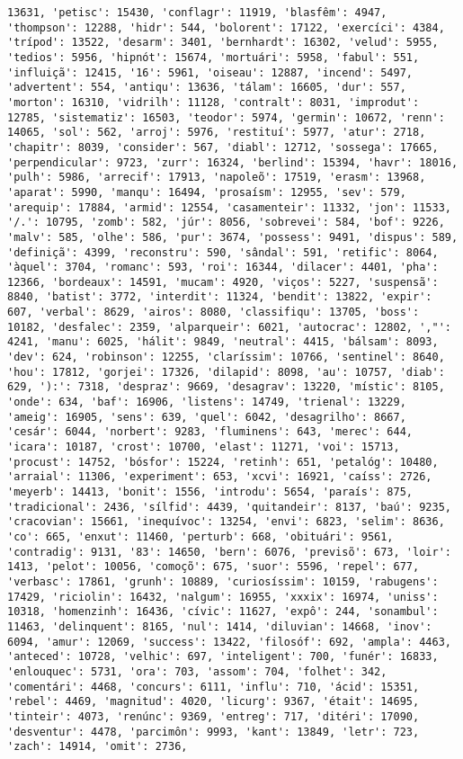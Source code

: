 \documentclass[11pt]{article}
\begin{document}
\begin{Verbatim}[commandchars=\\\{\}]
13631, 'petisc': 15430, 'conflagr': 11919, 'blasfêm': 4947, 'thompson': 12288, 'hidr': 544, 'bolorent': 17122, 'exercíci': 4384, 'trípod': 13522, 'desarm': 3401, 'bernhardt': 16302, 'velud': 5955, 'tedios': 5956, 'hipnót': 15674, 'mortuári': 5958, 'fabul': 551, 'influiçã': 12415, '16': 5961, 'oiseau': 12887, 'incend': 5497, 'advertent': 554, 'antiqu': 13636, 'tálam': 16605, 'dur': 557, 'morton': 16310, 'vidrilh': 11128, 'contralt': 8031, 'improdut': 12785, 'sistematiz': 16503, 'teodor': 5974, 'germin': 10672, 'renn': 14065, 'sol': 562, 'arroj': 5976, 'restituí': 5977, 'atur': 2718, 'chapitr': 8039, 'consider': 567, 'diabl': 12712, 'sossega': 17665, 'perpendicular': 9723, 'zurr': 16324, 'berlind': 15394, 'havr': 18016, 'pulh': 5986, 'arrecif': 17913, 'napoleõ': 17519, 'erasm': 13968, 'aparat': 5990, 'manqu': 16494, 'prosaísm': 12955, 'sev': 579, 'arequip': 17884, 'armid': 12554, 'casamenteir': 11332, 'jon': 11533, '/.': 10795, 'zomb': 582, 'júr': 8056, 'sobrevei': 584, 'bof': 9226, 'malv': 585, 'olhe': 586, 'pur': 3674, 'possess': 9491, 'dispus': 589, 'definiçã': 4399, 'reconstru': 590, 'sândal': 591, 'retific': 8064, 'àquel': 3704, 'romanc': 593, 'roi': 16344, 'dilacer': 4401, 'pha': 12366, 'bordeaux': 14591, 'mucam': 4920, 'viços': 5227, 'suspensã': 8840, 'batist': 3772, 'interdit': 11324, 'bendit': 13822, 'expir': 607, 'verbal': 8629, 'airos': 8080, 'classifiqu': 13705, 'boss': 10182, 'desfalec': 2359, 'alparqueir': 6021, 'autocrac': 12802, ',"': 4241, 'manu': 6025, 'hálit': 9849, 'neutral': 4415, 'bálsam': 8093, 'dev': 624, 'robinson': 12255, 'claríssim': 10766, 'sentinel': 8640, 'hou': 17812, 'gorjei': 17326, 'dilapid': 8098, 'au': 10757, 'diab': 629, '):': 7318, 'despraz': 9669, 'desagrav': 13220, 'místic': 8105, 'onde': 634, 'baf': 16906, 'listens': 14749, 'trienal': 13229, 'ameig': 16905, 'sens': 639, 'quel': 6042, 'desagrilho': 8667, 'cesár': 6044, 'norbert': 9283, 'fluminens': 643, 'merec': 644, 'icara': 10187, 'crost': 10700, 'elast': 11271, 'voi': 15713, 'procust': 14752, 'bósfor': 15224, 'retinh': 651, 'petalóg': 10480, 'arraial': 11306, 'experiment': 653, 'xcvi': 16921, 'caíss': 2726, 'meyerb': 14413, 'bonit': 1556, 'introdu': 5654, 'paraís': 875, 'tradicional': 2436, 'sílfid': 4439, 'quitandeir': 8137, 'baú': 9235, 'cracovian': 15661, 'inequívoc': 13254, 'envi': 6823, 'selim': 8636, 'co': 665, 'enxut': 11460, 'perturb': 668, 'obituári': 9561, 'contradig': 9131, '83': 14650, 'bern': 6076, 'previsõ': 673, 'loir': 1413, 'pelot': 10056, 'comoçõ': 675, 'suor': 5596, 'repel': 677, 'verbasc': 17861, 'grunh': 10889, 'curiosíssim': 10159, 'rabugens': 17429, 'riciolin': 16432, 'nalgum': 16955, 'xxxix': 16974, 'uniss': 10318, 'homenzinh': 16436, 'cívic': 11627, 'expô': 244, 'sonambul': 11463, 'delinquent': 8165, 'nul': 1414, 'diluvian': 14668, 'inov': 6094, 'amur': 12069, 'success': 13422, 'filosóf': 692, 'ampla': 4463, 'anteced': 10728, 'velhic': 697, 'inteligent': 700, 'funér': 16833, 'enlouquec': 5731, 'ora': 703, 'assom': 704, 'folhet': 342, 'comentári': 4468, 'concurs': 6111, 'influ': 710, 'ácid': 15351, 'rebel': 4469, 'magnitud': 4020, 'licurg': 9367, 'était': 14695, 'tinteir': 4073, 'renúnc': 9369, 'entreg': 717, 'ditéri': 17090, 'desventur': 4478, 'parcimôn': 9993, 'kant': 13849, 'letr': 723, 'zach': 14914, 'omit': 2736, 
\end{Verbatim}
\end{document}
